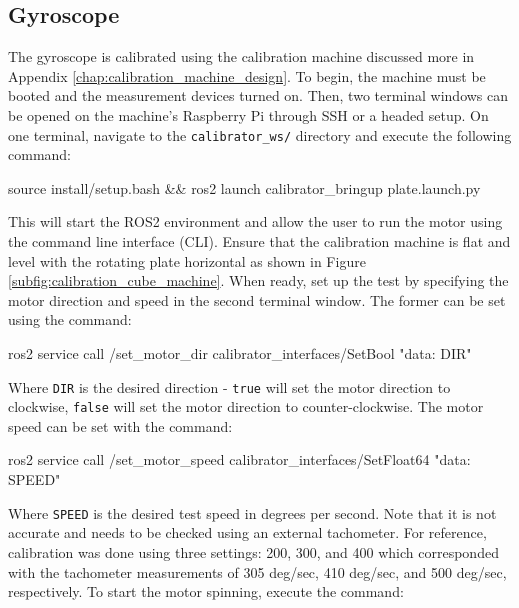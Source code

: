 \subsection{Gyroscope} 
The gyroscope is calibrated using the calibration machine discussed more in Appendix \ref{chap:calibration_machine_design}. 
To begin, the machine must be booted and the measurement devices turned on.
Then, two terminal windows can be opened on the machine's Raspberry Pi through SSH or a headed setup.
On one terminal, navigate to the \lstinline[style=customInline]|calibrator_ws/| directory and execute the following command:

\begin{bash}
    source install/setup.bash && ros2 launch calibrator_bringup plate.launch.py
\end{bash}

\noindent This will start the ROS2 environment and allow the user to run the motor using the command line interface (CLI).
Ensure that the calibration machine is flat and level with the rotating plate horizontal as shown in Figure \ref{subfig:calibration_cube_machine}.
When ready, set up the test by specifying the motor direction and speed in the second terminal window.
The former can be set using the command:

\begin{bash}
    ros2 service call /set_motor_dir calibrator_interfaces/SetBool "{data: DIR}"
\end{bash}

\noindent Where \lstinline[style=customInline]|DIR| is the desired direction - \lstinline[style=customInline]|true| will set the motor direction to clockwise, \lstinline[style=customInline]|false| will set the motor direction to counter-clockwise.
The motor speed can be set with the command:

\begin{bash}
    ros2 service call /set_motor_speed calibrator_interfaces/SetFloat64 "{data: SPEED}"
\end{bash}

\noindent Where \lstinline[style=customInline]|SPEED| is the desired test speed in degrees per second.
Note that it is not accurate and needs to be checked using an external tachometer.
For reference, calibration was done using three settings: 200, 300, and 400 which corresponded with the tachometer measurements of 305 deg/sec, 410 deg/sec, and 500 deg/sec, respectively.
To start the motor spinning, execute the command:

